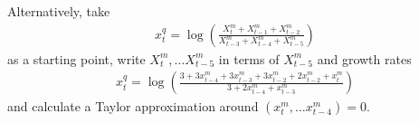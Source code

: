\documentclass[12pt,a4paper]{scrartcl}
\begin{document}
Alternatively, take 
\begin{align}
x^q_t = \log\left(\frac{X^m_t + X^m_{t-1} + X^m_{t-2}}{X^m_{t-3} + X^m_{t-4} + X^m_{t-5}}\right)
\end{align}
as a starting point, write $X^m_t, \dots X^m_{t-5}$ in terms of $X^m_{t-5}$ and growth rates 
\begin{align}
x^q_t = \log\left(\frac{3 + 3x^m_{t-4} + 3x^m_{t-3} + 3x^m_{t-2} + 2x^m_{t-2} +x^m_t}{3 + 2x^m_{t-4} + x^m_{t-3}}\right)
\end{align}
and calculate a Taylor approximation around $(x^m_t, \dots x^m_{t-4}) = 0$.\\
\end{document}
